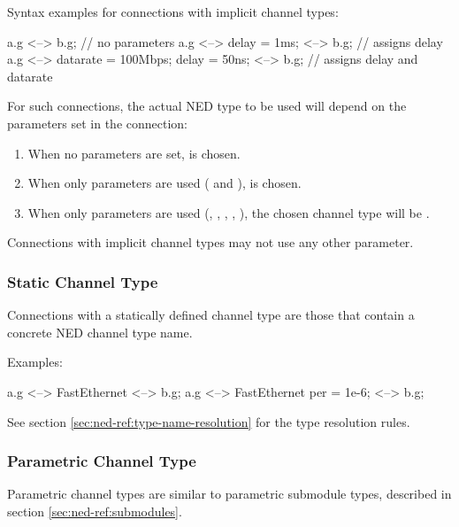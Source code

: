 Syntax examples for connections with implicit channel types:

\begin{ned}
a.g <--> b.g; // no parameters
a.g <--> {delay = 1ms;} <--> b.g;  // assigns delay
a.g <--> {datarate = 100Mbps; delay = 50ns;} <--> b.g; // assigns delay and datarate
\end{ned}

For such connections, the actual NED type to be used will depend on the
parameters set in the connection:

\begin{enumerate}
  \item When no parameters are set,  is chosen.
  \item When only  parameters are used (
        and ),  is chosen.
  \item When only  parameters are used
        (, , , , ),
        the chosen channel type will be .
\end{enumerate}

Connections with implicit channel types may not use any other parameter.

\subsubsection{Static Channel Type}
\label{sec:ned-ref:static-channel-type}

Connections with a statically defined channel type are those that
contain a concrete NED channel type name.

Examples:

\begin{ned}
a.g <--> FastEthernet <--> b.g;
a.g <--> FastEthernet {per = 1e-6;} <--> b.g;
\end{ned}

See section \ref{sec:ned-ref:type-name-resolution} for the type resolution
rules.


\subsubsection{Parametric Channel Type}
\label{sec:ned-ref:parametric-channel-type}

Parametric channel types are similar to parametric submodule types,
described in section \ref{sec:ned-ref:submodules}.

